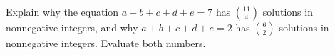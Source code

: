 Explain why the equation $a+b+c+d+e=7$ has $\binom{11}{4}$ solutions in nonnegative integers, and why $a+b+c+d+e=2$ has $\binom{6}{2}$ solutions in nonnegative integers. Evaluate both numbers.
